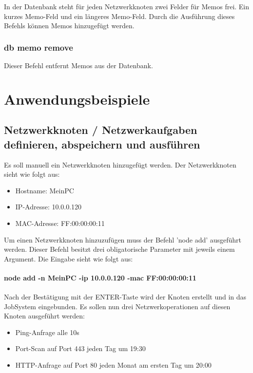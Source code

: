 \documentclass[12pt,a4paper]{report}
\begin{document}
In der Datenbank steht für jeden Netzwerkknoten zwei Felder für Memos frei. Ein kurzes Memo-Feld und ein längeres Memo-Feld. Durch die Ausführung dieses Befehls können Memos hinzugefügt werden.

\subsubsection{db memo remove}

Dieser Befehl entfernt Memos aus der Datenbank.

\section{Anwendungsbeispiele}

\subsection{Netzwerkknoten / Netzwerkaufgaben definieren, abspeichern und ausführen}

Es soll manuell ein Netzwerkknoten hinzugefügt werden. Der Netzwerkknoten sieht wie folgt aus:

\begin{itemize}
  \item Hostname: MeinPC
  \item IP-Adresse: 10.0.0.120
  \item MAC-Adresse: FF:00:00:00:11
\end{itemize}

Um einen Netzwerkknoten hinzuzufügen muss der Befehl 'node add' ausgeführt werden. Dieser Befehl besitzt drei obligatorische Parameter mit jeweils einem Argument. Die Eingabe sieht wie folgt aus:\\\\

\textbf{node add -n MeinPC -ip 10.0.0.120 -mac FF:00:00:00:11}\\\\

Nach der Bestätigung mit der ENTER-Taste wird der Knoten erstellt und in das JobSystem eingebunden. Es sollen nun drei Netzwerkoperationen auf diesen Knoten ausgeführt werden:

\begin{itemize}
\item Ping-Anfrage alle 10s
\item Port-Scan auf Port 443 jeden Tag um 19:30
\item HTTP-Anfrage auf Port 80 jeden Monat am ersten Tag um 20:00
\end{itemize}
\end{document}
